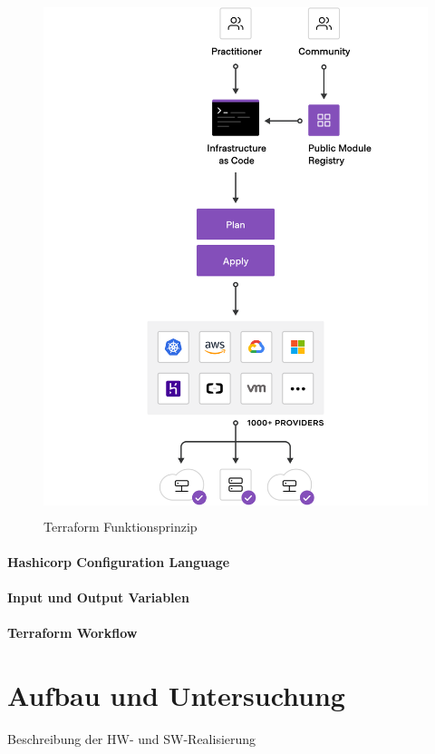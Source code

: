 \begin{figure}[H]
  \includegraphics[keepaspectratio, height=15cm]{fig/hauptteil/Terraform.png}
  \caption{Terraform Funktionsprinzip}
  \centering
\end{figure}

\subsubsection{Hashicorp Configuration Language}

\subsubsection{Input und Output Variablen}

\subsubsection{Terraform Workflow}

\chapter{Aufbau und Untersuchung}
\label{sec:real}
Beschreibung der HW- und SW-Realisierung

